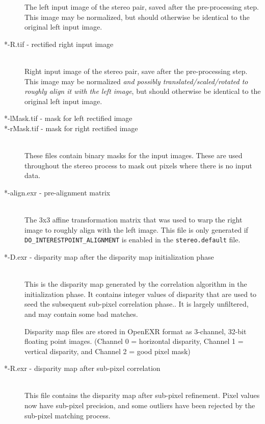 \begin{description}
  The left input image of the stereo pair, saved after the
  pre-processing step.  This image may be normalized, but should
  otherwise be identical to the original left input image.

\item[*-R.tif - rectified right input image] \hfill \\

  Right input image of the stereo pair, save after the pre-processing
  step.  This image may be normalized {\em and possibly
    translated/scaled/rotated to roughly align it with the left
    image}, but should otherwise be identical to the original left
  input image.

\item[*-lMask.tif - mask for left rectified image ]
\item[*-rMask.tif - mask for right rectified image ] \hfill \\

  These files contain binary masks for the input images.  These are
  used throughout the stereo process to mask out pixels where there is
  no input data.

\item[*-align.exr - pre-alignment matrix] \hfill \\

  The 3x3 affine transformation matrix that was used to warp the right
  image to roughly align with the left image.  This file is only
  generated if \texttt{DO\_INTERESTPOINT\_ALIGNMENT} is enabled in the
  {\tt stereo.default} file.

\item[*-D.exr - disparity map after the disparity map initialization phase] \hfill \\

  This is the disparity map generated by the correlation algorithm in
  the initialization phase.  It contains integer values of disparity
  that are used to seed the subsequent sub-pixel correlation phase..
  It is largely unfiltered, and may contain some bad matches.
  
  Disparity map files are stored in OpenEXR format as 3-channel,
  32-bit floating point images.  (Channel 0 = horizontal disparity,
  Channel 1 = vertical disparity, and Channel 2 = good pixel mask)

\item[*-R.exr - disparity map after sub-pixel correlation] \hfill \\

  This file contains the disparity map after sub-pixel refinement.
  Pixel values now have sub-pixel precision, and some outliers have
  been rejected by the sub-pixel matching process.


\end{description}
